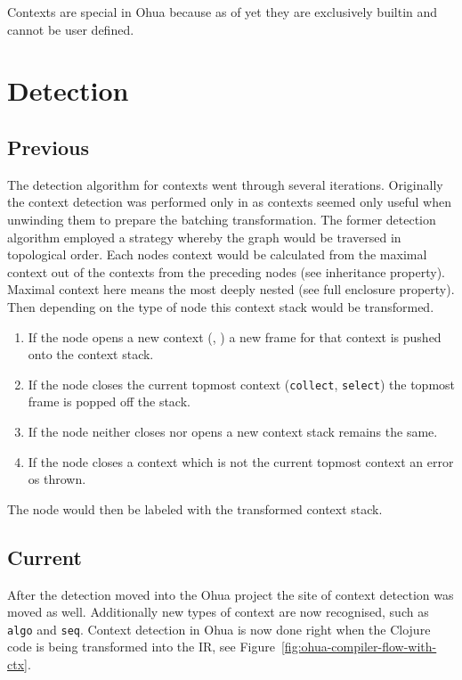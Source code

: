 Contexts are special in Ohua because as of yet they are exclusively builtin and cannot be user defined.

\section{Detection}

\subsection{Previous}

The detection algorithm for contexts went through several iterations.
Originally the context detection was performed only in \yauhau{} as contexts seemed only useful when unwinding them to prepare the batching transformation.
The former detection algorithm employed a strategy whereby the graph would be traversed in topological order.
Each nodes context would be calculated from the maximal context out of the contexts from the preceding nodes (see inheritance property).
Maximal context here means the most deeply nested (see full enclosure property).
Then depending on the type of node this context stack would be transformed.

\begin{enumerate}
  \item If the node opens a new context (\smap{}, \ifop{}) a new frame for that context is pushed onto the context stack.
  \item If the node closes the current topmost context (\texttt{collect}, \texttt{select}) the topmost frame is popped off the stack.
  \item If the node neither closes nor opens a new context stack remains the same.
  \item If the node closes a context which is not the current topmost context an error os thrown.
\end{enumerate}

The node would then be labeled with the transformed context stack.

\subsection{Current}

After the detection moved into the Ohua project the site of context detection was moved as well.
Additionally new types of context are now recognised, such as \texttt{algo} and \texttt{seq}.
Context detection in Ohua is now done right when the Clojure code is being transformed into the IR, see Figure~\ref{fig:ohua-compiler-flow-with-ctx}.

